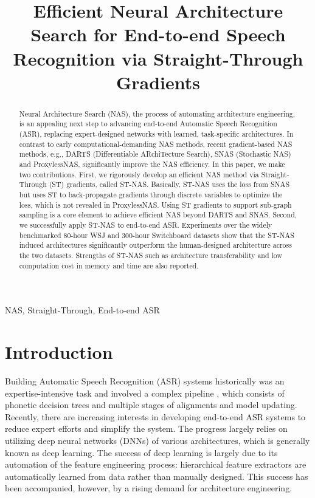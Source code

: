 \documentclass{article}
\title{Efficient Neural Architecture Search for End-to-end Speech Recognition via Straight-Through Gradients}
\begin{document}
\ninept
\setlength{\textfloatsep}{4pt}
\setlength{\abovedisplayskip}{3pt}
\setlength{\belowdisplayskip}{3pt}
\maketitle
\begin{abstract}
    Neural Architecture Search (NAS), the process of automating architecture engineering, is an appealing next step to advancing end-to-end Automatic Speech Recognition (ASR), replacing expert-designed networks with learned, task-specific architectures.
    In contrast to early computational-demanding NAS methods, recent gradient-based NAS methods, e.g., DARTS (Differentiable ARchiTecture Search), SNAS (Stochastic NAS) and ProxylessNAS, significantly improve the NAS efficiency.
    In this paper, we make two contributions.
    First, we rigorously develop an efficient NAS method via Straight-Through (ST) gradients, called ST-NAS.
    Basically, ST-NAS uses the loss from SNAS but uses ST to back-propagate gradients through discrete variables to optimize the loss, which is not revealed in ProxylessNAS.
    Using ST gradients to support sub-graph sampling is a core element to achieve efficient NAS beyond DARTS and SNAS.
    Second, we successfully apply ST-NAS to end-to-end ASR.
    Experiments over the widely benchmarked 80-hour WSJ and 300-hour Switchboard datasets show that the ST-NAS induced architectures significantly outperform the human-designed architecture across the two datasets.
    Strengths of ST-NAS such as architecture transferability and low computation cost in memory and time are also reported.
\end{abstract}
\begin{keywords}
    NAS, Straight-Through, End-to-end ASR
\end{keywords}
\section{Introduction}
\label{sec:intro}

Building Automatic Speech Recognition (ASR) systems historically was an expertise-intensive task and involved a complex pipeline \cite{soltau2005ibm, dahl2012context}, which consists of phonetic decision trees and multiple stages of alignments and model updating.
Recently, there are increasing interests in developing end-to-end ASR systems \cite{graves2006connectionist, graves2012sequence, chorowski2014end, xiang2019crf} to reduce expert efforts and simplify the system.
The progress largely relies on utilizing deep neural networks (DNNs) of various architectures, which is generally known as deep learning.
The success of deep learning is largely due to its automation of the feature engineering process: hierarchical feature extractors are automatically learned from data rather than manually designed.
This success has been accompanied, however, by a rising demand for architecture engineering.
\end{document}
